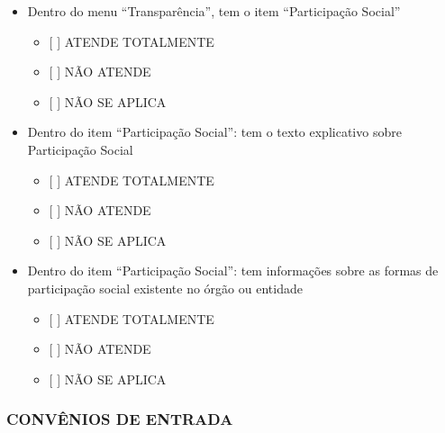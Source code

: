\documentclass[]{book}
\providecommand{\tightlist}{%
  \setlength{\itemsep}{0pt}\setlength{\parskip}{0pt}}
\begin{document}
\begin{itemize}
\tightlist
\item
  Dentro do menu ``Transparência'', tem o item ``Participação Social''

  \begin{itemize}
  \tightlist
  \item
    {[} {]} ATENDE TOTALMENTE
  \item
    {[} {]} NÃO ATENDE
  \item
    {[} {]} NÃO SE APLICA
  \end{itemize}
\item
  Dentro do item ``Participação Social'': tem o texto explicativo sobre Participação Social

  \begin{itemize}
  \tightlist
  \item
    {[} {]} ATENDE TOTALMENTE
  \item
    {[} {]} NÃO ATENDE
  \item
    {[} {]} NÃO SE APLICA
  \end{itemize}
\item
  Dentro do item ``Participação Social'': tem informações sobre as formas de participação social existente no órgão ou entidade

  \begin{itemize}
  \tightlist
  \item
    {[} {]} ATENDE TOTALMENTE
  \item
    {[} {]} NÃO ATENDE
  \item
    {[} {]} NÃO SE APLICA
  \end{itemize}
\end{itemize}

\hypertarget{convuxeanios-de-entrada-1}{%
\subsubsection*{CONVÊNIOS DE ENTRADA}\label{convuxeanios-de-entrada-1}}
\end{document}
